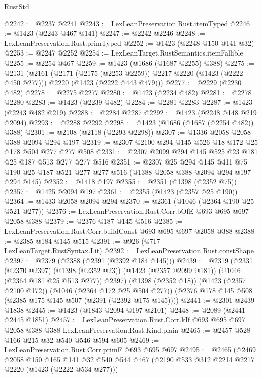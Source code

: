 \begin{lexlean}{RustStd}
\begin{coremodule}
@2242 := @2237 @2241
@2243 := LexLeanPreservation.Rust.itemTyped
@2246 := @1423 (@2243 @467 @141)
@2247 := @2242 @2246
@2248 := LexLeanPreservation.Rust.primTyped
@2252 := @1423 (@2248 @150 @141 @32)
@2253 := @2247 @2252
@2254 := LexLeanTarget.RustSemantics.itemFallible
@2255 := @2254 @467
@2259 := @1423 (@1686 (@1687 @2255) @388)
@2275 := @2131
    (@2161
      (@2171 (@2175 (@2253 @2259)) @2217 @2220 (@1423 (@2222 @450 @277)))
      @2220
      (@1423 (@2222 @443 @479)))
@2277 := @2229 (@2230 @482)
@2278 := @2275 @2277
@2280 := @1423 (@2234 @482)
@2281 := @2278 @2280
@2283 := @1423 (@2239 @482)
@2284 := @2281 @2283
@2287 := @1423 (@2243 @482 @219)
@2288 := @2284 @2287
@2292 := @1423 (@2248 @148 @219 @2094)
@2293 := @2288 @2292
@2298 := @1423 (@1686 (@1687 (@2254 @482)) @388)
@2301 := @2108 (@2118 (@2293 @2298))
@2307 := @1336 @2058 @2058 @388 @2094 @294 @197
@2319 := @2307 @2100 @294 @145 @526 @18 @172 @25 @178 @504 @277 @277 @508
@2331 := @2307 @2099 @294 @145 @525 @23 @181 @25 @187 @513 @277 @277 @516
@2351 := @2307
    @25
    @294
    @145
    @411
    @75
    @190
    @25
    @187
    @521
    @277
    @277
    @516
    (@1388 @2058 @388 @2094 @294 @197 @294 @145)
@2352 := @1418 @197
@2355 := @2351 (@1398 (@2352 @75))
@2357 := @1425 @2094 @197
@2361 := @2355 (@1423 (@2357 @25 @190))
@2364 := @1433 @2058 @2094 @294
@2370 := @2361 (@1046 (@2364 @190 @25 @521 @277))
@2376 := LexLeanPreservation.Rust.Corr.bOfE @693 @695 @697 @2058 @388
@2379 := @2376 @187 @145 @516
@2385 := LexLeanPreservation.Rust.Corr.buildConst @693 @695 @697 @2058 @388
@2388 := @2385 @184 @145 @515
@2391 := @926 (@717 LexLeanTarget.RustSyntax.Lit)
@2392 := LexLeanPreservation.Rust.constShape
@2397 := @2379 (@2388 (@2391 (@2392 @184 @145)))
@2439 := @2319
    (@2331
      (@2370 @2397)
      (@1398 (@2352 @23))
      (@1423 (@2357 @2099 @181))
      (@1046 (@2364 @181 @25 @513 @277))
      @2397)
    (@1398 (@2352 @18))
    (@1423 (@2357 @2100 @172))
    (@1046 (@2364 @172 @25 @504 @277))
    (@2376 @178 @145 @508 (@2385 @175 @145 @507 (@2391 (@2392 @175 @145))))
@2441 := @2301 @2439 @1838
@2445 := @1423 (@1843 @2094 @197 @2101)
@2448 := @2089 (@2441 @2445 @1851)
@2457 := LexLeanPreservation.Rust.Corr.kIf
    @693
    @695
    @697
    @2058
    @388
    @388
    LexLeanPreservation.Rust.Kind.plain
@2465 := @2457 @528 @166 @215 @32 @540 @546 @594 @605
@2469 := LexLeanPreservation.Rust.Corr.primF @693 @695 @697
@2495 := @2465
    (@2469
      @2058
      @150
      @165
      @141
      @32
      @540
      @544
      @467
      (@2190 @533 @312 @2214 @2217 @2220 (@1423 (@2222 @534 @277)))

\end{coremodule}
\end{lexlean}
